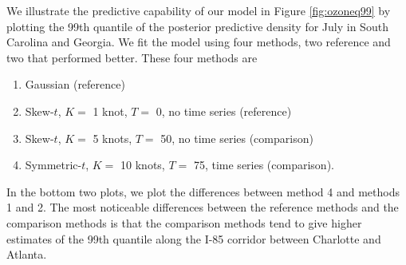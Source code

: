 \documentclass[11pt]{article}
\begin{document}
We illustrate the predictive capability of our model in Figure \ref{fig:ozoneq99} by plotting the 99th quantile of the posterior predictive density for July in South Carolina and Georgia.
We fit the model using four methods, two reference and two that performed better.
These four methods are
\begin{enumerate}\setlength{\itemsep}{-0.5em}
  \item Gaussian (reference)
  \item Skew-$t$, $K =$ 1 knot, $T = $ 0, no time series (reference)
  \item Skew-$t$, $K =$ 5 knots, $T = $ 50, no time series (comparison)
  \item Symmetric-$t$, $K =$ 10 knots, $T = $ 75, time series (comparison).
\end{enumerate}
In the bottom two plots, we plot the differences between method 4 and methods 1 and 2.
The most noticeable differences between the reference methods and the comparison methods is that the comparison methods tend to give higher estimates of the 99th quantile along the I-85 corridor between Charlotte and Atlanta.
\end{document}
